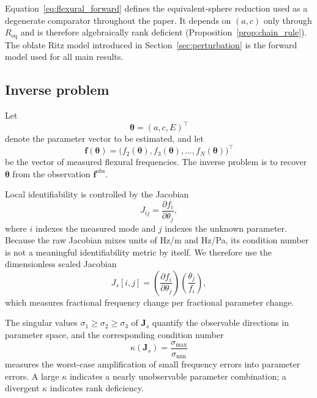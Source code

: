 Equation~\eqref{eq:flexural_forward} defines the equivalent-sphere reduction
used as a degenerate comparator throughout the paper.  It depends on $(a,c)$
only through $R_\mathrm{eq}$ and is therefore algebraically rank deficient
(Proposition~\ref{prop:chain_rule}).  The oblate Ritz model introduced in
Section~\ref{sec:perturbation} is the forward model used for all main results.

\subsection{Inverse problem}

Let
\begin{equation}
  \boldsymbol{\theta} = (a,c,E)^\top
\end{equation}
denote the parameter vector to be estimated, and let
\begin{equation}
  \mathbf{f}(\boldsymbol{\theta})
  =
  \bigl(f_2(\boldsymbol{\theta}),
        f_3(\boldsymbol{\theta}),
        \ldots,
        f_N(\boldsymbol{\theta})\bigr)^\top
\end{equation}
be the vector of measured flexural frequencies.  The inverse problem is to
recover $\boldsymbol{\theta}$ from the observation
$\mathbf{f}^\mathrm{obs}$.

Local identifiability is controlled by the Jacobian
\begin{equation}\label{eq:jacobian_raw}
  J_{ij}
  =
  \frac{\partial f_i}{\partial \theta_j},
\end{equation}
where $i$ indexes the measured mode and $j$ indexes the unknown parameter.
Because the raw Jacobian mixes units of \si{Hz/m} and \si{Hz/Pa}, its condition
number is not a meaningful identifiability metric by itself.  We therefore use
the dimensionless scaled Jacobian
\begin{equation}\label{eq:jacobian_scaled}
  J_s[i,j]
  =
  \left(\frac{\partial f_i}{\partial \theta_j}\right)
  \left(\frac{\theta_j}{f_i}\right),
\end{equation}
which measures fractional frequency change per fractional parameter change.

The singular values $\sigma_1 \ge \sigma_2 \ge \sigma_3$ of $\mathbf{J}_s$
quantify the observable directions in parameter space, and the corresponding
condition number
\begin{equation}\label{eq:kappa}
  \kappa(\mathbf{J}_s)
  =
  \frac{\sigma_{\max}}{\sigma_{\min}}
\end{equation}
measures the worst-case amplification of small frequency errors into parameter
errors.  A large $\kappa$ indicates a nearly unobservable parameter
combination; a divergent $\kappa$ indicates rank deficiency.

